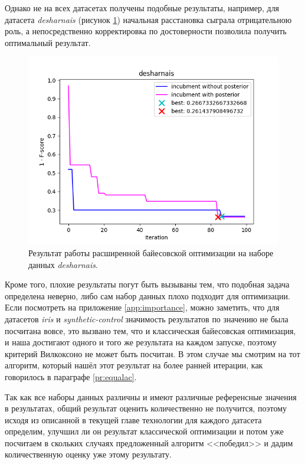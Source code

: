 \documentclass[times,specification,annotation]{itmo-student-thesis}
\begin{document}
	Однако не на всех датасетах получены подобные результаты, например, для датасета \textit{desharnais} (рисунок \ref{img:pbo-desharnais}) начальная расстановка сыграла отрицательною роль, а непосредственно корректировка по достоверности позволила получить оптимальный результат.
	\begin{figure}[!ht]
		\caption{Результат работы расширенной байесовской оптимизации на наборе данных \textit{desharnais}.}\label{img:pbo-desharnais}
		\includegraphics[width=0.85\linewidth]{../png/incubment-iteration-posterior/desharnais}
		\centering
	\end{figure} \par 

	Кроме того, плохие результаты погут быть вызываны тем, что подобная задача определена неверно, либо сам набор данных плохо подходит для оптимизации. Если посмотреть на приложение \ref{app:importance}, можно заметить, что для датасетов \textit{iris} и \textit{synthetic-control} значимость результатов по значению не была посчитана вовсе, это вызвано тем, что и классическая байесовская оптимизация, и наша достигают одного и того же результата на каждом запуске, поэтому критерий Вилкоксоно не может быть посчитан. В этом случае мы смотрим на тот алгоритм, который нашёл этот результат на более ранней итерации, как говорилось в параграфе \ref{pr:equalac}.
	\par 
	
	Так как все наборы данных различны и имеют различные референсные значения в результатах, общий результат оценить количественно не получится, поэтому исходя из описанной в текущей главе технологии для каждого датасета определим, улучшил ли он результат классической оптимизации и потом уже посчитаем в скольких случаях предложенный алгоритм <<победил>> и дадим количественную оценку уже этому результату.
	\par 
	
\end{document}
